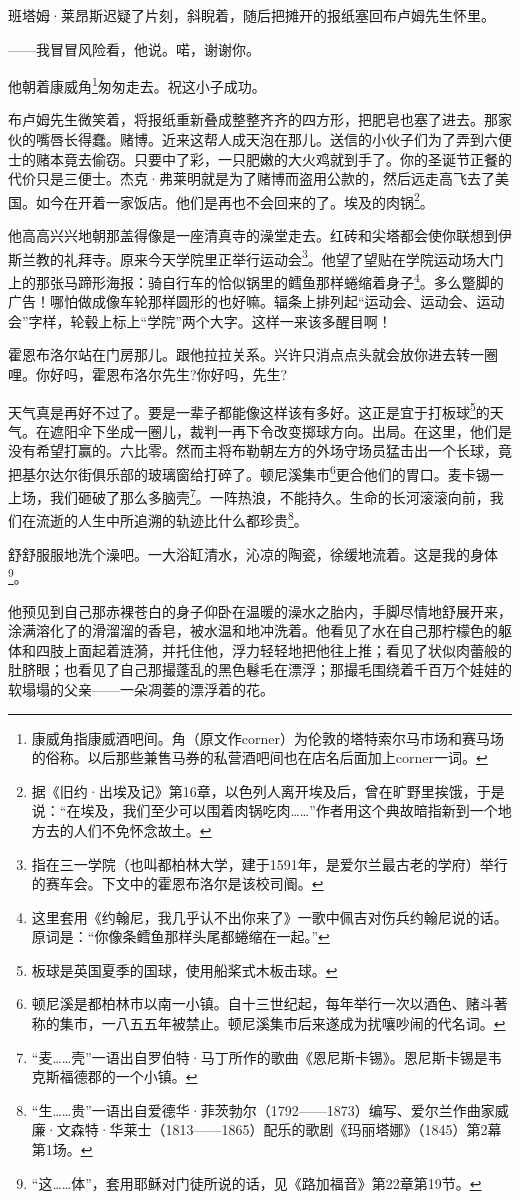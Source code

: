 \par 班塔姆·莱昂斯迟疑了片刻，斜睨着，随后把摊开的报纸塞回布卢姆先生怀里。
\par ——我冒冒风险看，他说。喏，谢谢你。
\par 他朝着康威角\footnote{康威角指康威酒吧间。角（原文作corner）为伦敦的塔特索尔马市场和赛马场的俗称。以后那些兼售马券的私营酒吧间也在店名后面加上corner一词。}匆匆走去。祝这小子成功。
\par 布卢姆先生微笑着，将报纸重新叠成整整齐齐的四方形，把肥皂也塞了进去。那家伙的嘴唇长得蠢。赌博。近来这帮人成天泡在那儿。送信的小伙子们为了弄到六便士的赌本竟去偷窃。只要中了彩，一只肥嫩的大火鸡就到手了。你的圣诞节正餐的代价只是三便士。杰克·弗莱明就是为了赌博而盗用公款的，然后远走高飞去了美国。如今在开着一家饭店。他们是再也不会回来的了。埃及的肉锅\footnote{据《旧约·出埃及记》第16章，以色列人离开埃及后，曾在旷野里挨饿，于是说：“在埃及，我们至少可以围着肉锅吃肉……”作者用这个典故暗指新到一个地方去的人们不免怀念故土。}。
\par 他高高兴兴地朝那盖得像是一座清真寺的澡堂走去。红砖和尖塔都会使你联想到伊斯兰教的礼拜寺。原来今天学院里正举行运动会\footnote{指在三一学院（也叫都柏林大学，建于1591年，是爱尔兰最古老的学府）举行的赛车会。下文中的霍恩布洛尔是该校司阍。}。他望了望贴在学院运动场大门上的那张马蹄形海报：骑自行车的恰似锅里的鳕鱼那样蜷缩着身子\footnote{这里套用《约翰尼，我几乎认不出你来了》一歌中佩吉对伤兵约翰尼说的话。原词是：“你像条鳕鱼那样头尾都蜷缩在一起。”}。多么蹩脚的广告！哪怕做成像车轮那样圆形的也好嘛。辐条上排列起“运动会、运动会、运动会”字样，轮毂上标上“学院”两个大字。这样一来该多醒目啊！
\par 霍恩布洛尔站在门房那儿。跟他拉拉关系。兴许只消点点头就会放你进去转一圈哩。你好吗，霍恩布洛尔先生?你好吗，先生?
\par 天气真是再好不过了。要是一辈子都能像这样该有多好。这正是宜于打板球\footnote{板球是英国夏季的国球，使用船桨式木板击球。}的天气。在遮阳伞下坐成一圈儿，裁判一再下令改变掷球方向。出局。在这里，他们是没有希望打赢的。六比零。然而主将布勒朝左方的外场守场员猛击出一个长球，竟把基尔达尔街俱乐部的玻璃窗给打碎了。顿尼溪集市\footnote{顿尼溪是都柏林市以南一小镇。自十三世纪起，每年举行一次以酒色、赌斗著称的集市，一八五五年被禁止。顿尼溪集市后来遂成为扰嚷吵闹的代名词。}更合他们的胃口。麦卡锡一上场，我们砸破了那么多脑壳\footnote{“麦……壳”一语出自罗伯特·马丁所作的歌曲《恩尼斯卡锡》。恩尼斯卡锡是韦克斯福德郡的一个小镇。}。一阵热浪，不能持久。生命的长河滚滚向前，我们在流逝的人生中所追溯的轨迹比什么都珍贵\footnote{“生……贵”一语出自爱德华·菲茨勃尔（1792——1873）编写、爱尔兰作曲家威廉·文森特·华莱士（1813——1865）配乐的歌剧《玛丽塔娜》（1845）第2幕第1场。}。
\par 舒舒服服地洗个澡吧。一大浴缸清水，沁凉的陶瓷，徐缓地流着。这是我的身体\footnote{“这……体”，套用耶稣对门徒所说的话，见《路加福音》第22章第19节。}。
\par 他预见到自己那赤裸苍白的身子仰卧在温暖的澡水之胎内，手脚尽情地舒展开来，涂满溶化了的滑溜溜的香皂，被水温和地冲洗着。他看见了水在自己那柠檬色的躯体和四肢上面起着涟漪，并托住他，浮力轻轻地把他往上推；看见了状似肉蕾般的肚脐眼；也看见了自己那撮蓬乱的黑色鬈毛在漂浮；那撮毛围绕着千百万个娃娃的软塌塌的父亲——一朵凋萎的漂浮着的花。



